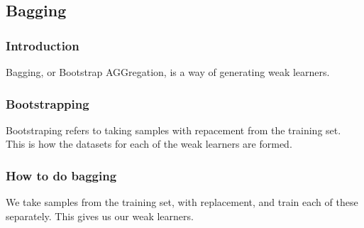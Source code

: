 
\subsection{Bagging}

\subsubsection{Introduction}

Bagging, or Bootstrap AGGregation, is a way of generating weak learners.

\subsubsection{Bootstrapping}

Bootstraping refers to taking samples with repacement from the training set. This is how the datasets for each of the weak learners are formed.	

\subsubsection{How to do bagging}

We take samples from the training set, with replacement, and train each of these separately. This gives us our weak learners.


